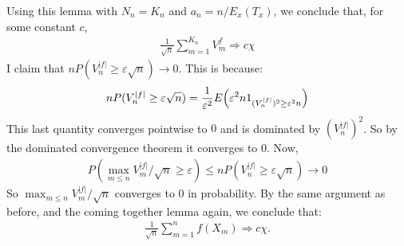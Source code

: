 \documentclass[12pt]{article}
\def\ve{\varepsilon}
\begin{document}
    Using this lemma with $N_n = K_n$ and $a_n = n/E_x(T_x)$, we conclude that, for some constant $c$,
    \begin{align*}
        \frac{1}{\sqrt{n}} \sum_{m=1}^{K_n} V_m^f \Rightarrow c\chi
    \end{align*}
    I claim that $nP(V_n^{|f|} \geq \ve \sqrt{n}) \to 0$. This is because:
    \begin{align*}
        nP(V_n^{|f|} \geq \ve \sqrt{n}) = \frac{1}{\ve^2} E\qty(\ve^2n 1_{(V_n^{|f|})^2 \geq \ve^2 n})
    \end{align*}
    This last quantity converges pointwise to $0$ and is dominated by $(V_n^{|f|})^2$. So by the dominated convergence theorem it converges to 0. Now,
    \begin{align*}
        P(\max_{m \leq n} V_m^{|f|}/\sqrt{n} \geq \ve) \leq nP(V_n^{|f|} \geq \ve \sqrt{n}) \to 0
    \end{align*}
    So $\max_{m \leq n} V_m^{|f|}/\sqrt{n}$ converges to 0 in probability. By the same argument as before, and the coming together lemma again, we conclude that:
    \begin{align*}
        \frac{1}{\sqrt{n}} \sum_{m=1}^n f(X_m) \Rightarrow c\chi.
    \end{align*}
\end{document}
